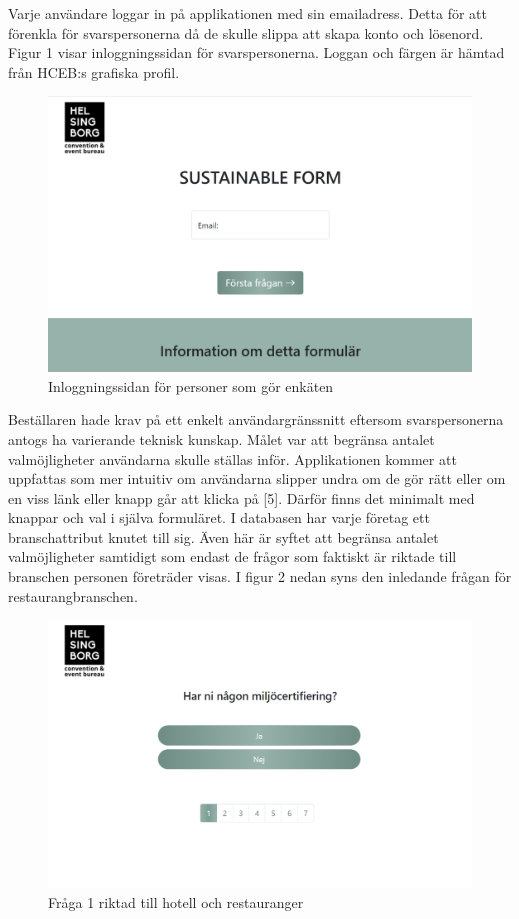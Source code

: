 \documentclass[12pt]{article}
\begin{document}
Varje användare loggar in på applikationen med sin emailadress. Detta för att förenkla för svarspersonerna då de skulle slippa att skapa konto och lösenord. Figur 1 visar inloggningssidan för svarspersonerna. Loggan och färgen är hämtad från HCEB:s grafiska profil. \\

\begin{figure}[H]
    \centering
    \includegraphics[width=12cm]{images/log_in_page.png}
    \caption{Inloggningssidan för personer som gör enkäten}
    \label{fig:my_label}
\end{figure}

Beställaren hade krav på ett enkelt användargränssnitt eftersom svarspersonerna antogs ha varierande teknisk kunskap. Målet var att begränsa antalet valmöjligheter användarna skulle ställas inför. Applikationen kommer att uppfattas som mer intuitiv om användarna slipper undra om de gör rätt eller om en viss länk eller knapp går att klicka på [5]. Därför finns det minimalt med knappar och val i själva formuläret. I databasen har varje företag ett branschattribut knutet till sig. Även här är syftet att begränsa antalet valmöjligheter samtidigt som endast de frågor som faktiskt är riktade till branschen personen företräder visas. I figur 2 nedan syns den inledande frågan för restaurangbranschen.


\begin{figure}[H]
    \centering
    \includegraphics[width=12cm]{images/question_page.png}
    \caption{Fråga 1 riktad till hotell och restauranger}
    \label{fig:question}
\end{figure}
\end{document}
